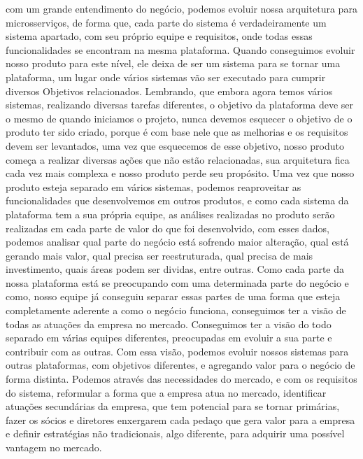       com um grande entendimento do negócio, podemos evoluir nossa arquitetura para
      microsserviços, de forma que, cada parte do sistema é verdadeiramente um sistema
      apartado, com seu próprio equipe e requisitos, onde todas essas funcionalidades
      se encontram na mesma plataforma. Quando conseguimos evoluir nosso produto
      para este nível, ele deixa de ser um sistema para se tornar uma plataforma,
      um lugar onde vários sistemas vão ser executado para cumprir diversos Objetivos
      relacionados. Lembrando, que embora agora temos vários sistemas, realizando
      diversas tarefas diferentes, o objetivo da plataforma deve ser o mesmo de
      quando iniciamos o projeto, nunca devemos esquecer o objetivo de o produto ter
      sido criado, porque é com base nele que as melhorias e os requisitos devem ser
      levantados, uma vez que esquecemos de esse objetivo, nosso produto começa a
      realizar diversas ações que não estão relacionadas, sua arquitetura fica cada
      vez mais complexa e nosso produto perde seu propósito. \newline
      Uma vez que nosso produto esteja separado em vários sistemas, podemos reaproveitar
      as funcionalidades que desenvolvemos em outros produtos, e como cada sistema
      da plataforma tem a sua própria equipe, as análises realizadas no produto
      serão realizadas em cada parte de valor do que foi desenvolvido, com esses
      dados, podemos analisar qual parte do negócio está sofrendo maior alteração,
      qual está gerando mais valor, qual precisa ser reestruturada, qual precisa
      de mais investimento, quais áreas podem ser dividas, entre outras. Como
      cada parte da nossa plataforma está se preocupando com uma determinada parte
      do negócio e como, nosso equipe já conseguiu separar essas partes de uma forma
      que esteja completamente aderente a como o negócio funciona, conseguimos ter
      a visão de todas as atuações da empresa no mercado. Conseguimos ter a visão
      do todo separado em várias equipes diferentes, preocupadas em evoluir a sua
      parte e contribuir com as outras. Com essa visão, podemos evoluir nossos
      sistemas para outras plataformas, com objetivos diferentes, e agregando
      valor para o negócio de forma distinta. Podemos através das necessidades do
      mercado, e com os requisitos do sistema, reformular a forma que a empresa
      atua no mercado, identificar atuações secundárias da empresa, que tem potencial
      para se tornar primárias, fazer os sócios e diretores enxergarem cada pedaço
      que gera valor para a empresa e definir estratégias não tradicionais, algo
      diferente, para adquirir uma possível vantagem no mercado.

